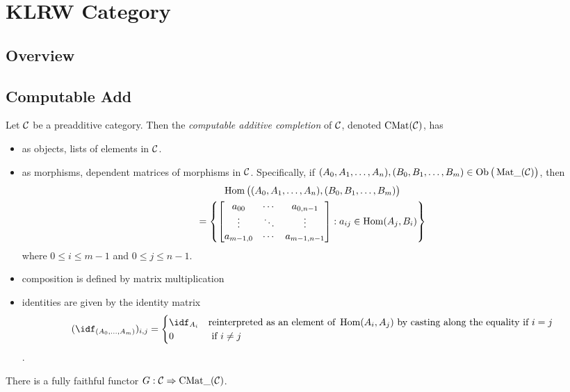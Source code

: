 
\chapter{KLRW Category}

\section{Overview}
\section{Computable Add}


\begin{definition}
 Let $\mathcal{C}$ be a preadditive category. Then the \emph{computable additive completion}
 of $\mathcal{C}$, denoted $\operatorname{CMat}(\mathcal{C})$, has
 \begin{itemize}
  \item as objects, lists of elements in $\mathcal{C}$.
  \item as morphisms, dependent matrices of morphisms in $\mathcal{C}$.
  Specifically, if $(A_0, A_1, \ldots, A_n), (B_0, B_1, \ldots, B_m) \in \operatorname{Ob}\big(\operatorname{Mat\_}(\mathcal{C})\big)$, then
\begin{multline*}
\operatorname{Hom}\big((A_0, A_1, \ldots, A_n), (B_0, B_1, \ldots, B_m)\big) \\
= \left\{
\begin{bmatrix}
  a_{00} & \cdots & a_{0,n-1} \\
  \vdots & \ddots & \vdots \\
  a_{m-1,0} & \cdots & a_{m-1,n-1}
\end{bmatrix}
: a_{ij} \in \operatorname{Hom}(A_j, B_i)
\right\}
\end{multline*}
where $0 \le i \le m-1$ and $0 \le j \le n-1$.

  \item composition is defined by matrix multiplication
  \item identities are given by the identity matrix
  $$ (\idf_{(A_0, \ldots, A_m)})_{i, j} = \begin{cases}
  \idf_{A_i} & \text{reinterpreted as an element of }\Hom(A_i, A_j)
  \text{ by casting along the equality if }i = j
  \\ 0 & \text{ if }i\ne j
  \end{cases}$$.
 \end{itemize}
\end{definition}
  There is a fully faithful functor $G: \mathcal{C} \Rightarrow \operatorname{CMat\_}(\mathcal{C})$.

